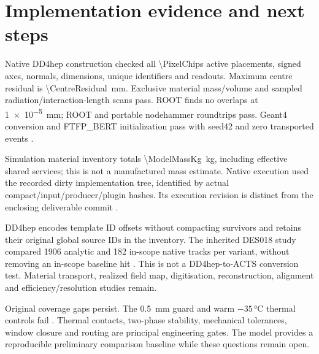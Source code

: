 \section{Implementation evidence and next steps}
Native DD4hep construction checked all \num{\PixelChips} active placements,
signed axes, normals, dimensions, unique identifiers and readouts. Maximum centre
residual is \qty{\CentreResidual}{\milli\metre}. Exclusive material mass/volume
and sampled radiation/interaction-length scans pass. ROOT finds no overlaps
at \qty{1e-5}{\milli\metre}; ROOT and portable nodehammer roundtrips pass.
Geant4 conversion and FTFP\_BERT initialization pass with seed42 and zero
transported events \cite{model}.

Simulation material inventory totals \qty{\ModelMassKg}{\kilogram}, including
effective shared services; this is not a manufactured mass estimate. Native
execution used the recorded dirty implementation tree, identified by actual
compact/input/producer/plugin hashes. Its execution revision is distinct from
the enclosing deliverable commit \cite{model}.

DD4hep encodes template ID offsets without compacting survivors and retains
their original global source IDs in the inventory. The inherited DES018 study
compared \num{1906} analytic and \num{182} in-scope native tracks per variant,
without removing an in-scope baseline hit \cite{trim}. This is not a
DD4hep-to-ACTS conversion test. Material transport, realized field map,
digitisation, reconstruction, alignment and efficiency/resolution studies remain.

Original coverage gaps persist. The \qty{0.5}{\milli\metre} guard and warm
$-35\,\unit{\degreeCelsius}$ thermal controls fail \cite{mixed,trim}.
Thermal contacts, two-phase stability, mechanical tolerances, window closure
and routing are principal engineering gates. The model provides a reproducible
preliminary comparison baseline while these questions remain open.
